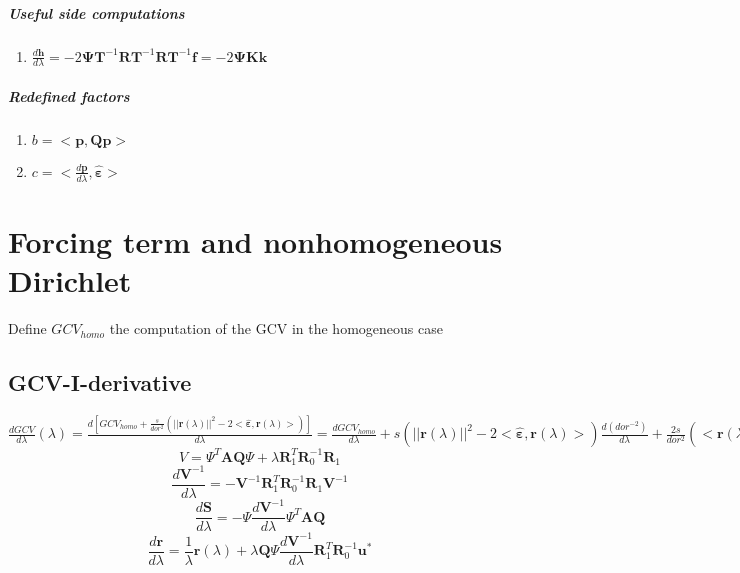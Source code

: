 \documentclass[11pt,twoside]{report}
\begin{document}
\paragraph{Useful side computations}
\begin{enumerate}
	\item $ \frac{d\mathbold{h}}{d\lambda} = -2\boldsymbol{\Psi} \textbf{T}^{-1} \textbf{R}\textbf{T}^{-1} \textbf{R}\textbf{T}^{-1} \mathbf{f} = -2\boldsymbol{\Psi} \textbf{K} \textbf{k}$
\end{enumerate}

\paragraph{Redefined factors}
\begin{enumerate}
	\item $b = <\mathbold{p},\mathbold{Q}\mathbold{p}>$
	\item $c = <\frac{d\mathbold{p}}{d\lambda}, \hat{\mathbold{\varepsilon}}> $
\end{enumerate}


\chapter{Forcing term and nonhomogeneous Dirichlet}
Define $GCV_{homo}$ the computation of the GCV in the homogeneous case
\section{GCV-I-derivative}
$ \frac{dGCV}{d\lambda}(\lambda)=\frac{d[GCV_{homo}+\frac{s}{dor^2}(||\textbf{r}(\lambda)||^2-2<\hat{\mathbold{\varepsilon}},\textbf{r}(\lambda)>)]}{d\lambda}=\frac{dGCV_{homo}}{d\lambda}+s(||\textbf{r}(\lambda)||^2-2<\hat{\mathbold{\varepsilon}},\textbf{r}(\lambda)>)\frac{d(dor^{-2})}{d\lambda}+\frac{2s}{dor^2}(<\textbf{r}(\lambda),\frac{d\textbf{r}}{d\lambda}>-<\frac{d\hat{\mathbold{\varepsilon}}}{d\lambda},\textbf{r}(\lambda)>-<\hat{\mathbold{\varepsilon}},\frac{d\textbf{r}(\lambda)}{d\lambda}>)$\\
\begin{equation}
V=\Psi^T\textbf{AQ}\Psi+\lambda \textbf{R}_1^T\textbf{R}_0^{-1}\textbf{R}_1
\end{equation}
\begin{equation}
\frac{d\textbf{V}^{-1}}{d\lambda}=-\textbf{V}^{-1}\textbf{R}_1^T\textbf{R}_0^{-1}\textbf{R}_1 \textbf{V}^{-1}
\end{equation}
\begin{equation}
\frac{d\textbf{S}}{d\lambda}=-\Psi \frac{d\textbf{V}^{-1}}{d\lambda}\Psi^T\textbf{AQ}
\end{equation}
\begin{equation}
\frac{d\textbf{r}}{d\lambda}=\frac{1}{\lambda}\textbf{r}(\lambda)+\lambda \textbf{Q}\Psi \frac{d\textbf{V}^{-1}}{d\lambda} \textbf{R}_1^T\textbf{R}_0^{-1}\textbf{u}^{*}
\end{equation}
\end{document}
